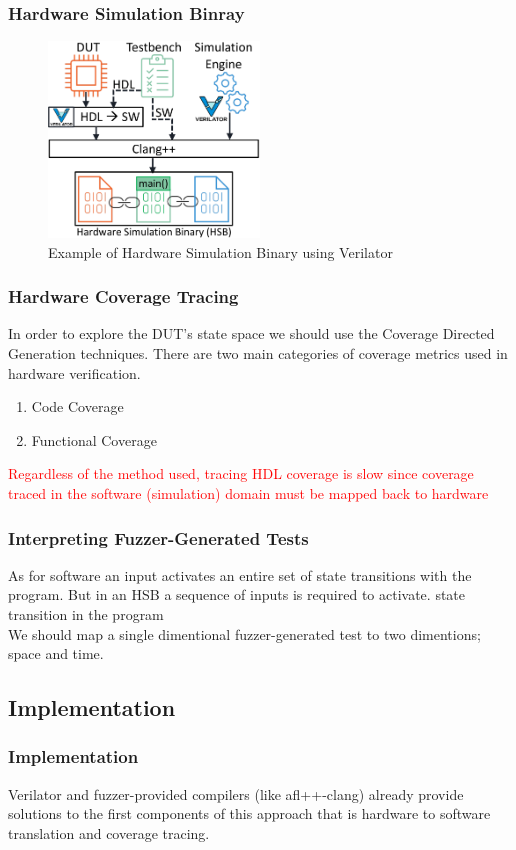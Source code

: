 \documentclass{beamer}
\begin{document}
\begin{frame}
    \frametitle{Hardware Simulation Binray}
    \begin{figure}
        \centering
        \includegraphics[width=0.5\textwidth]{hsb.png}
        \caption{Example of Hardware Simulation Binary using Verilator}
        \label{fig:hsb}
    \end{figure}
\end{frame}

\begin{frame}
    \frametitle{Hardware Coverage Tracing}
    In order to explore the DUT's state space we should use the Coverage
    Directed Generation techniques. There are two main categories of coverage
    metrics used in hardware verification.
    \begin{enumerate}
        \item Code Coverage
        \item Functional Coverage
    \end{enumerate}
    \textcolor{red}{Regardless of the method used, tracing HDL coverage is
    slow since coverage traced in the software (simulation) domain must be
    mapped back to hardware}
\end{frame}

\begin{frame}
    \frametitle{Interpreting Fuzzer-Generated Tests}
    As for software an input activates an entire set of state transitions with
    the program. But in an HSB a sequence of inputs is required to activate.
    state transition in the program \\
    We should map a single dimentional fuzzer-generated test to two dimentions;
    space and time.
\end{frame}

\subsection{Implementation}
\begin{frame}
    \frametitle{Implementation}
    Verilator and fuzzer-provided compilers (like afl++-clang) already provide
    solutions to the first components of this approach that is hardware to
    software translation and coverage tracing.
\end{frame}
\end{document}

